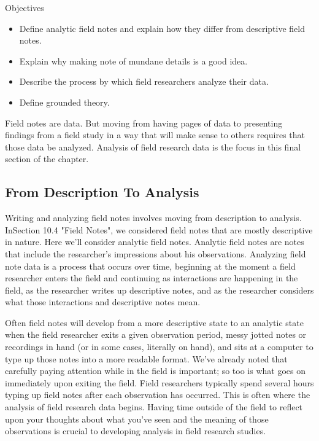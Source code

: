 \begin{center}
	\begin{objbox}{Objectives}
		\begin{itemize}
			\setlength{\itemsep}{0pt}
			\setlength{\parskip}{0pt}
			\setlength{\parsep}{0pt}
			
			\item Define analytic field notes and explain how they differ from descriptive field notes.
			\item Explain why making note of mundane details is a good idea.
			\item Describe the process by which field researchers analyze their data.
			\item Define grounded theory.
			
		\end{itemize}
	\end{objbox}
\end{center}

Field notes are data. But moving from having pages of data to presenting findings from a field study in a way that will make sense to others requires that those data be analyzed. Analysis of field research data is the focus in this final section of the chapter.

\subsection{From Description To Analysis}

Writing and analyzing field notes involves moving from description to analysis. InSection 10.4 "Field Notes", we considered field notes that are mostly descriptive in nature. Here we’ll consider analytic field notes. Analytic field notes are notes that include the researcher’s impressions about his observations. Analyzing field note data is a process that occurs over time, beginning at the moment a field researcher enters the field and continuing as interactions are happening in the field, as the researcher writes up descriptive notes, and as the researcher considers what those interactions and descriptive notes mean.

Often field notes will develop from a more descriptive state to an analytic state when the field researcher exits a given observation period, messy jotted notes or recordings in hand (or in some cases, literally on hand), and sits at a computer to type up those notes into a more readable format. We’ve already noted that carefully paying attention while in the field is important; so too is what goes on immediately upon exiting the field. Field researchers typically spend several hours typing up field notes after each observation has occurred. This is often where the analysis of field research data begins. Having time outside of the field to reflect upon your thoughts about what you’ve seen and the meaning of those observations is crucial to developing analysis in field research studies.

